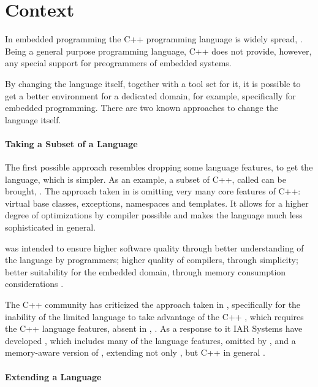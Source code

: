 
\section{Context}

In embedded programming the C++ programming language is widely spread, \cite{embedlangs}. Being a general purpose 
programming language, C++ does not provide, however, any special support for preogrammers of embedded systems. 

By changing  the language itself, together with a tool set for it, it is possible to get a better environment 
for a dedicated domain, for example, specifically for embedded programming. There are two known approaches to change
the language itself.

\paragraph{Taking a Subset of a Language}

The first possible approach resembles dropping some language features, to get the language, which is simpler. 
As an example, a subset of C++, called  can be brought, \cite{emcpp}. The approach taken in  is 
omitting very many core features of C++: virtual base classes, exceptions, namespaces and templates. 
It allows for a higher degree of optimizations by compiler possible and makes the language much less sophisticated
in general.

 was intended to ensure higher software quality through better understanding of the language
by programmers; higher quality of compilers, through simplicity; better suitability for the embedded domain, through
memory consumption considerations \cite{stripepp}. 

The C++ community has criticized the approach taken in , specifically for the inability of the 
limited language to take advantage of the C++ , which requires the C++ language features, absent in 
, \cite{stremcpp}. As a response to it IAR Systems have developed , which includes many of the language features,
omitted by , and a memory-aware version of , extending not only , but C++ in general \cite{extendedembeddedcpp}.

\paragraph{Extending a Language}

